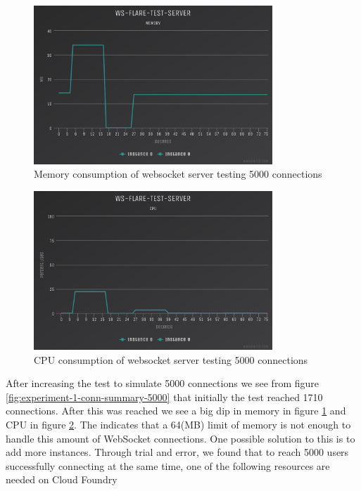 \begin{figure}[H]
  \centering
    \includegraphics[width=0.8\textwidth]{figures/experiments/experiment-1/node-js/memory-5000.png}
    \caption{Memory consumption of websocket server testing 5000 connections}
    \label{fig:experiment-1-memory-5000}
\end{figure}

\begin{figure}[H]
  \centering
    \includegraphics[width=0.8\textwidth]{figures/experiments/experiment-1/node-js/cpu-5000.png}
    \caption{CPU consumption of websocket server testing 5000 connections}
    \label{fig:experiment-1-cpu-5000}
\end{figure}

After increasing the test to simulate 5000 connections we see from figure \ref{fig:experiment-1-conn-summary-5000} that initially the test reached 1710 connections. After this was reached we see a big dip in memory in figure \ref{fig:experiment-1-memory-5000} and CPU in figure \ref{fig:experiment-1-cpu-5000}. The indicates that a 64(MB) limit of memory is not enough to handle this amount of WebSocket connections. One possible solution to this is to add more instances. Through trial and error, we found that to reach 5000 users successfully connecting at the same time, one of the following resources are needed on Cloud Foundry

